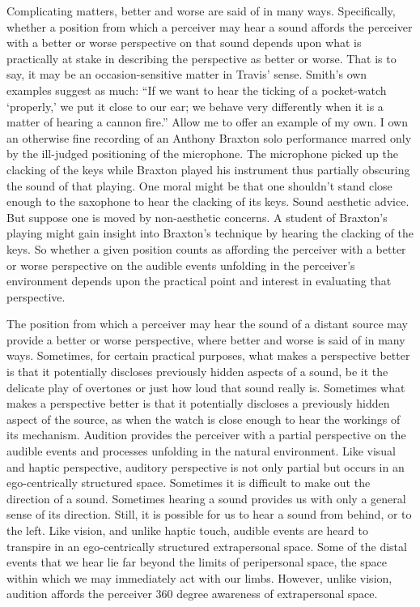 Complicating matters, better and worse are said of in many ways. Specifically, whether a position from which a perceiver may hear a sound affords the perceiver with a better or worse perspective on that sound depends upon what is practically at stake in describing the perspective as better or worse. That is to say, it may be an occasion-sensitive matter in Travis' \citeyearpar{Travis:2008la} sense. Smith's own examples suggest as much: ``If we want to hear the ticking of a pocket-watch `properly,' we put it close to our ear; we behave very differently when it is a matter of hearing a cannon fire.'' Allow me to offer an example of my own. I own an otherwise fine recording of an Anthony Braxton solo performance marred only by the ill-judged positioning of the microphone. The microphone picked up the clacking of the keys while Braxton played his instrument thus partially obscuring the sound of that playing. One moral might be that one shouldn't stand close enough to the saxophone to hear the clacking of its keys. Sound aesthetic advice. But suppose one is moved by non-aesthetic concerns. A student of Braxton's playing might gain insight into Braxton's technique by hearing the clacking of the keys. So whether a given position counts as affording the perceiver with a better or worse perspective on the audible events unfolding in the perceiver's environment depends upon the practical point and interest in evaluating that perspective.

The position from which a perceiver may hear the sound of a distant source may provide a better or worse perspective, where better and worse is said of in many ways. Sometimes, for certain practical purposes, what makes a perspective better is that it potentially discloses previously hidden aspects of a sound, be it the delicate play of overtones or just how loud that sound really is. Sometimes what makes a perspective better is that it potentially discloses a previously hidden aspect of the source, as when the watch is close enough to hear the workings of its mechanism. Audition provides the perceiver with a partial perspective on the audible events and processes unfolding in the natural environment. Like visual and haptic perspective, auditory perspective is not only partial but occurs in an ego-centrically structured space. Sometimes it is difficult to make out the direction of a sound. Sometimes hearing a sound provides us with only a general sense of its direction. Still, it is possible for us to hear a sound from behind, or to the left. Like vision, and unlike haptic touch, audible events are heard to transpire in an ego-centrically structured extrapersonal space. Some of the distal events that we hear lie far beyond the limits of peripersonal space, the space within which we may immediately act with our limbs. However, unlike vision, audition affords the perceiver 360 degree awareness of extrapersonal space. 

